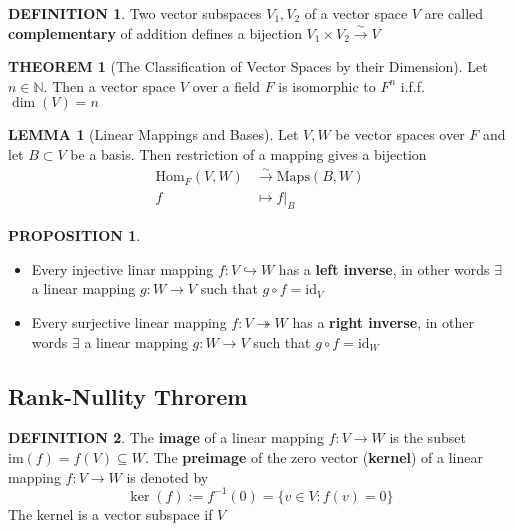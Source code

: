 \documentclass[12pt]{article}
\theoremstyle{definition}
\newtheorem{definition}{DEFINITION}[subsection]
\newtheorem{theorem}{THEOREM}[subsection]
\newcommand{\Hom}{\text{Hom}}
\newcommand{\Maps}{\text{Maps}}
\newcommand{\image}{\text{im}}
\newtheorem{lemma}{LEMMA}[subsection]
\newtheorem{prop}{PROPOSITION}[subsection]
\begin{document}
\begin{definition}
    Two vector subspaces $V_1,V_2$ of a vector space $V$ are called \textbf{complementary} of addition defines a bijection $V_1 \times V_2 {\stackrel{\sim}{\rightarrow}} V$
\end{definition}

\begin{theorem}[The Classification of Vector Spaces by their Dimension]
    Let $n\in \mathbb{N}$. Then a vector space $V$ over a field $F$ is isomorphic to $F^n$ i.f.f. $\dim(V) = n$
\end{theorem}

\begin{lemma}[Linear Mappings and Bases]
    Let $V,W$ be vector spaces over $F$ and let $B \subset V$ be a basis. Then restriction of a mapping gives a bijection
    \[\begin{split}
        \Hom_F(V,W) &\stackrel{\sim}{\rightarrow} \Maps(B,W)\\
        f &\mapsto f|_B
    \end{split}\]
\end{lemma}

\begin{prop}
    \quad
    \begin{itemize}
        \item Every injective linar mapping $f:V \hookrightarrow W$ has a \textbf{left inverse}, in other words $\exists$ a linear mapping $g: W \rightarrow V$ such that $g \circ f = \text{id}_V$
        \item Every surjective linear mapping $f:V \twoheadrightarrow W$ has a \textbf{right inverse}, in other words $\exists$ a linear mapping $g: W \rightarrow V$ such that $g \circ f = \text{id}_W$
    \end{itemize}
\end{prop}

\subsection{Rank-Nullity Throrem}
\begin{definition}
    The \textbf{image} of a linear mapping $f: V \rightarrow W$ is the subset $\image(f) = f(V) \subseteq W$. The \textbf{preimage} of the zero vector (\textbf{kernel}) of a linear mapping $f: V \rightarrow W$ is denoted by $$\ker(f) := f^{-1}(0) = \{v \in V: f(v) = 0\}$$
    The kernel is a vector subspace if $V$
\end{definition}
\end{document}
